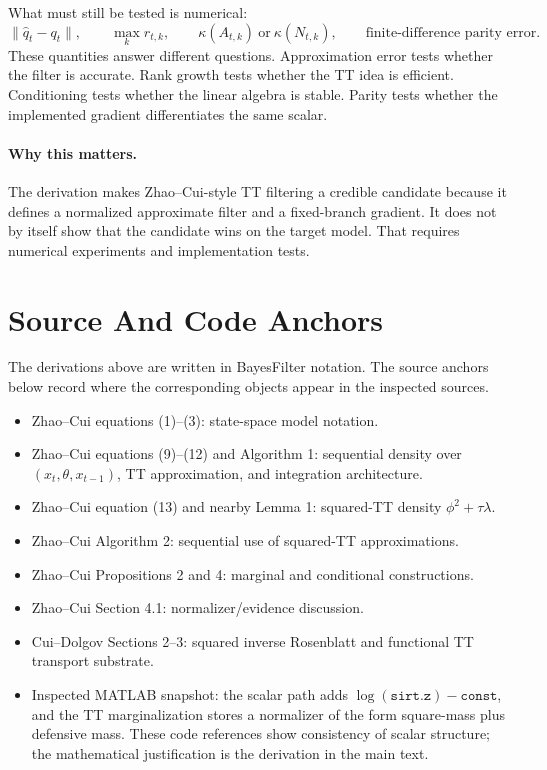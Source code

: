 \documentclass[11pt]{article}
\renewcommand{\[}{\begin{equation}}
\renewcommand{\]}{\end{equation}}
\theoremstyle{definition}
\theoremstyle{remark}
\begin{document}
What must still be tested is numerical:
\[
  \|\widehat q_t-q_t\|,\qquad
  \max_k r_{t,k},\qquad
  \kappa(A_{t,k})\ \text{or}\ \kappa(N_{t,k}),\qquad
  \text{finite-difference parity error}.
\]
These quantities answer different questions.  Approximation error tests
whether the filter is accurate.  Rank growth tests whether the TT idea is
efficient.  Conditioning tests whether the linear algebra is stable.  Parity
tests whether the implemented gradient differentiates the same scalar.

\paragraph{Why this matters.}
The derivation makes Zhao--Cui-style TT filtering a credible candidate because
it defines a normalized approximate filter and a fixed-branch gradient.  It
does not by itself show that the candidate wins on the target model.  That
requires numerical experiments and implementation tests.

\appendix
\section{Source And Code Anchors}

The derivations above are written in BayesFilter notation.  The source anchors
below record where the corresponding objects appear in the inspected sources.

\begin{itemize}[leftmargin=*]
\item Zhao--Cui equations (1)--(3): state-space model notation.
\item Zhao--Cui equations (9)--(12) and Algorithm 1: sequential density over
  \((x_t,\theta,x_{t-1})\), TT approximation, and integration architecture.
\item Zhao--Cui equation (13) and nearby Lemma 1: squared-TT density
  \(\phi^2+\tau\lambda\).
\item Zhao--Cui Algorithm 2: sequential use of squared-TT approximations.
\item Zhao--Cui Propositions 2 and 4: marginal and conditional constructions.
\item Zhao--Cui Section 4.1: normalizer/evidence discussion.
\item Cui--Dolgov Sections 2--3: squared inverse Rosenblatt and functional TT
  transport substrate.
\item Inspected MATLAB snapshot: the scalar path adds
  \(\log(\texttt{sirt.z})-\texttt{const}\), and the TT marginalization stores a
  normalizer of the form square-mass plus defensive mass.  These code
  references show consistency of scalar structure; the mathematical
  justification is the derivation in the main text.
\end{itemize}
\end{document}
